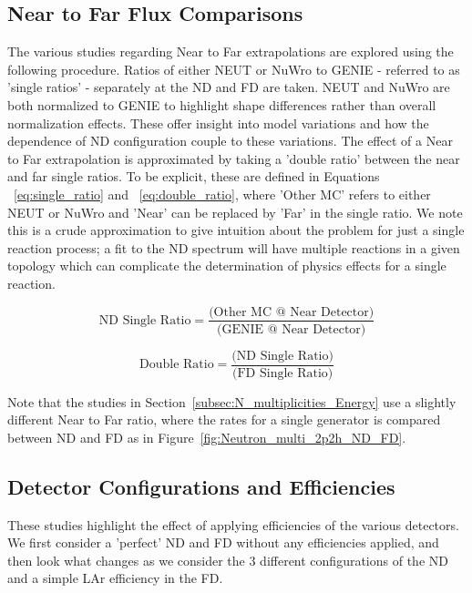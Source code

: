 \documentclass[12pt]{article}
\begin{document}
\subsection{Near to Far Flux Comparisons}
\label{subsec:ntf}
The various studies regarding Near to Far extrapolations are explored using the following procedure. Ratios of either NEUT or NuWro to GENIE - referred to as 'single ratios' - separately at the ND and FD are taken. NEUT and NuWro are both normalized to GENIE to highlight shape differences rather than overall normalization effects. These offer insight into model variations and how the dependence of ND configuration couple to these variations.
The effect of a Near to Far extrapolation is approximated by taking a 'double ratio' between the near and far single ratios. To be explicit, these are defined in Equations ~\ref{eq:single_ratio} and ~\ref{eq:double_ratio}, where 'Other MC' refers to either NEUT or NuWro and 'Near' can be replaced by 'Far' in the single ratio. We note this is a crude approximation to give intuition about the problem for just a single reaction process; a fit to the ND spectrum will have multiple reactions in a given topology which can complicate the determination of physics effects for a single reaction.

\begin{equation}
\label{eq:single_ratio}
\textrm{ND Single Ratio} = \frac{\textrm{(Other MC @ Near Detector)}}{\textrm{(GENIE @ Near Detector)}}
\end{equation}

\begin{equation}
\label{eq:double_ratio}
\textrm{Double Ratio} = \frac{\textrm{(ND Single Ratio)}}{\textrm{(FD Single Ratio)}}
\end{equation}

Note that the studies in Section~\ref{subsec:N_multiplicities_Energy} use a slightly different Near to Far ratio, where the rates for a single generator is compared between ND and FD as in Figure~\ref{fig:Neutron_multi_2p2h_ND_FD}.
\subsection{Detector Configurations and Efficiencies}
\label{subsec:eff}
These studies highlight the effect of applying efficiencies of the various detectors. We first consider a 'perfect' ND and FD without any efficiencies applied, and then look what changes as we consider the 3 different configurations of the ND and a simple LAr efficiency in the FD. 
\end{document}
